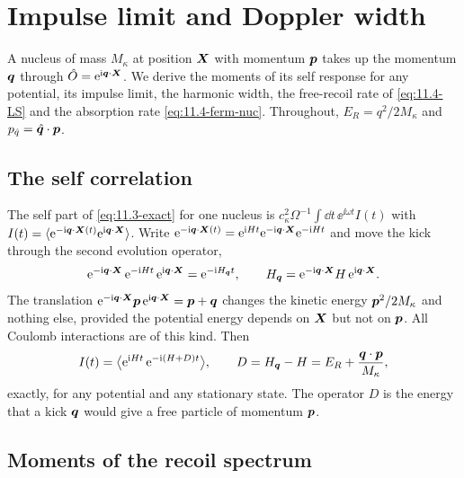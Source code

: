 \section{Impulse limit and Doppler width}\label{app:D.32}

A nucleus of mass $M_\kappa$ at position $\bm{X}$ with momentum $\bm{p}$ takes up the momentum $\bm{q}$ through $\hat{O} = \mathrm{e}^{\mathrm{i}\bm{q}\cdot\bm{X}}$. We derive the moments of its self response for any potential, its impulse limit, the harmonic width, the free-recoil rate of \cref{eq:11.4-LS} and the absorption rate \cref{eq:11.4-ferm-nuc}. Throughout, $E_R = q^2/2M_\kappa$ and $p_{\hat q} = \hat{\bm{q}}\cdot\bm{p}$.

\subsection{The self correlation}

The self part of \cref{eq:11.3-exact} for one nucleus is $c_\kappa^2\Omega^{-1}\int\dd t\,\ee^{\ii\omega t}I(t)$ with $I(t) = \langle\mathrm{e}^{-\mathrm{i}\bm{q}\cdot\bm{X}(t)}\mathrm{e}^{\mathrm{i}\bm{q}\cdot\bm{X}}\rangle$. Write $\mathrm{e}^{-\mathrm{i}\bm{q}\cdot\bm{X}(t)} = \mathrm{e}^{\mathrm{i} Ht}\mathrm{e}^{-\mathrm{i}\bm{q}\cdot\bm{X}}\mathrm{e}^{-\mathrm{i} Ht}$ and move the kick through the second evolution operator,
\begin{equation*}
  \mathrm{e}^{-\mathrm{i}\bm{q}\cdot\bm{X}}\,\mathrm{e}^{-\mathrm{i} Ht}\,\mathrm{e}^{\mathrm{i}\bm{q}\cdot\bm{X}} = \mathrm{e}^{-\mathrm{i} H_{\bm{q}}t} , \qquad H_{\bm{q}} = \mathrm{e}^{-\mathrm{i}\bm{q}\cdot\bm{X}}H\,\mathrm{e}^{\mathrm{i}\bm{q}\cdot\bm{X}} .
\end{equation*}
The translation $\mathrm{e}^{-\mathrm{i}\bm{q}\cdot\bm{X}}\bm{p}\,\mathrm{e}^{\mathrm{i}\bm{q}\cdot\bm{X}} = \bm{p} + \bm{q}$ changes the kinetic energy $\bm{p}^2/2M_\kappa$ and nothing else, provided the potential energy depends on $\bm{X}$ but not on $\bm{p}$. All Coulomb interactions are of this kind. Then
\begin{equation}
  I(t) = \bigl\langle\mathrm{e}^{\mathrm{i} Ht}\,\mathrm{e}^{-\mathrm{i}(H + D)t}\bigr\rangle , \qquad D = H_{\bm{q}} - H = E_R + \frac{\bm{q}\cdot\bm{p}}{M_\kappa} ,
  \label{eq:D.32-I}
\end{equation}
exactly, for any potential and any stationary state. The operator $D$ is the energy that a kick $\bm{q}$ would give a free particle of momentum $\bm{p}$.

\subsection{Moments of the recoil spectrum}


